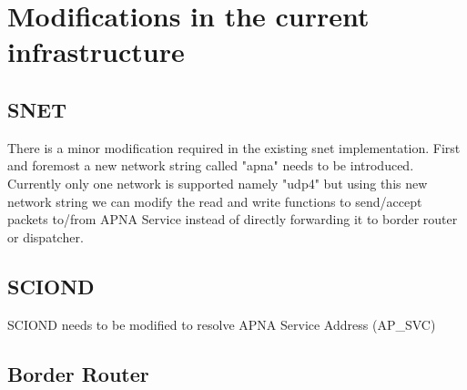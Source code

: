 \section{Modifications in the current infrastructure}
\subsection{SNET}
There is a minor modification required in the existing snet implementation. First and foremost a new network string called "apna" needs to be introduced. Currently only one network is supported namely "udp4" but using this new network string we can modify the read and write functions to send/accept packets to/from APNA Service instead of directly forwarding it to border router or dispatcher.
\subsection{SCIOND}
SCIOND needs to be modified to resolve APNA Service Address (AP\_SVC)
\subsection{Border Router}
